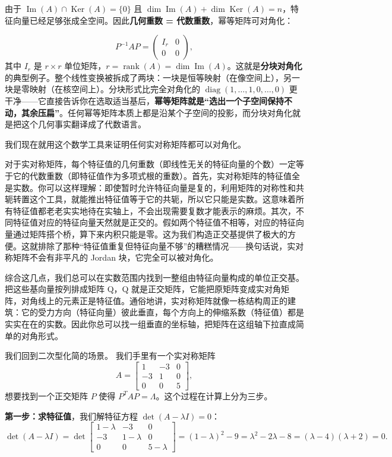 \documentclass[UTF8]{ctexbook}
\begin{document}
由于 $\operatorname{Im}(A) \cap \operatorname{Ker}(A) = \{0\}$ 且 $\dim\operatorname{Im}(A) + \dim\operatorname{Ker}(A) = n$，特征向量已经足够张成全空间。因此\textbf{几何重数 = 代数重数}，幂等矩阵可对角化：

\[
P^{-1}AP = \begin{pmatrix}
I_r & 0 \\
0 & 0
\end{pmatrix},
\]
其中 $I_r$ 是 $r \times r$ 单位矩阵，$r = \operatorname{rank}(A) = \dim \operatorname{Im}(A)$。这就是\textbf{分块对角化}的典型例子。整个线性变换被拆成了两块：一块是恒等映射（在像空间上），另一块是零映射（在核空间上）。分块形式比完全对角化的 $\operatorname{diag}(1,\dots,1,0,\dots,0)$ 更干净——它直接告诉你在选取适当基后，\textbf{幂等矩阵就是“选出一个子空间保持不动，其余压扁”}。任何幂等矩阵本质上都是沿某个子空间的投影，而分块对角化就是把这个几何事实翻译成了代数语言。

我们现在就用这个数学工具来证明任何实对称矩阵都可以对角化。

对于实对称矩阵，每个特征值的几何重数（即线性无关的特征向量的个数）一定等于它的代数重数（即特征值作为多项式根的重数）。首先，实对称矩阵的特征值全是实数。你可以这样理解：即使暂时允许特征向量是复的，利用矩阵的对称性和共轭转置这个工具，就能推出特征值等于它的共轭，所以它只能是实数。这意味着所有特征值都老老实实地待在实轴上，不会出现需要复数才能表示的麻烦。其次，不同特征值对应的特征向量天然就是正交的。假如两个特征值不相等，对应的特征向量通过矩阵搭个桥，算下来内积只能是零。这为我们构造正交基提供了极大的方便。这就排除了那种“特征值重复但特征向量不够”的糟糕情况——换句话说，实对称矩阵不会有非平凡的 Jordan 块，它完全可以被对角化。


综合这几点，我们总可以在实数范围内找到一整组由特征向量构成的单位正交基。把这些基向量按列排成矩阵 Q，Q 就是正交矩阵，它能把原矩阵变成实对角矩阵，对角线上的元素正是特征值。通俗地讲，实对称矩阵就像一栋结构周正的建筑：它的受力方向（特征向量）彼此垂直，每个方向上的伸缩系数（特征值）都是实实在在的实数。因此你总可以找一组垂直的坐标轴，把矩阵在这组轴下拉直成简单的对角形式。

我们回到二次型化简的场景\label{diag}。
我们手里有一个实对称矩阵
\[
A = \begin{bmatrix}
1 & -3 & 0 \\
-3 & 1 & 0 \\
0 & 0 & 5
\end{bmatrix},
\]
想要找到一个正交矩阵 $P$ 使得 $P^TAP = \Lambda$。这个过程在计算上分为三步。

\textbf{第一步：求特征值}，我们解特征方程 $\det(A - \lambda I)=0$：
\[
\det(A - \lambda I) = \det\begin{bmatrix}
1-\lambda & -3 & 0 \\
-3 & 1-\lambda & 0 \\
0 & 0 & 5-\lambda
\end{bmatrix} =(1-\lambda)^2 - 9 = \lambda^2 - 2\lambda - 8 = (\lambda-4)(\lambda+2) = 0.
\]
\end{document}
